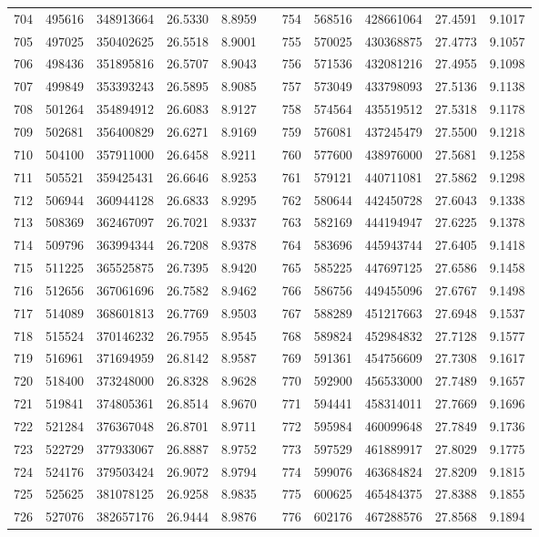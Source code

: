 \begin{longtable}{rrrrrrrrrrr}
704&495616&348913664&26.5330&8.8959&&754&568516&428661064&27.4591&9.1017\\
705&497025&350402625&26.5518&8.9001&&755&570025&430368875&27.4773&9.1057\\
706&498436&351895816&26.5707&8.9043&&756&571536&432081216&27.4955&9.1098\\
707&499849&353393243&26.5895&8.9085&&757&573049&433798093&27.5136&9.1138\\
708&501264&354894912&26.6083&8.9127&&758&574564&435519512&27.5318&9.1178\\
709&502681&356400829&26.6271&8.9169&&759&576081&437245479&27.5500&9.1218\\
710&504100&357911000&26.6458&8.9211&&760&577600&438976000&27.5681&9.1258\\
711&505521&359425431&26.6646&8.9253&&761&579121&440711081&27.5862&9.1298\\
712&506944&360944128&26.6833&8.9295&&762&580644&442450728&27.6043&9.1338\\
713&508369&362467097&26.7021&8.9337&&763&582169&444194947&27.6225&9.1378\\
714&509796&363994344&26.7208&8.9378&&764&583696&445943744&27.6405&9.1418\\
715&511225&365525875&26.7395&8.9420&&765&585225&447697125&27.6586&9.1458\\
716&512656&367061696&26.7582&8.9462&&766&586756&449455096&27.6767&9.1498\\
717&514089&368601813&26.7769&8.9503&&767&588289&451217663&27.6948&9.1537\\
718&515524&370146232&26.7955&8.9545&&768&589824&452984832&27.7128&9.1577\\
719&516961&371694959&26.8142&8.9587&&769&591361&454756609&27.7308&9.1617\\
720&518400&373248000&26.8328&8.9628&&770&592900&456533000&27.7489&9.1657\\
721&519841&374805361&26.8514&8.9670&&771&594441&458314011&27.7669&9.1696\\
722&521284&376367048&26.8701&8.9711&&772&595984&460099648&27.7849&9.1736\\
723&522729&377933067&26.8887&8.9752&&773&597529&461889917&27.8029&9.1775\\
724&524176&379503424&26.9072&8.9794&&774&599076&463684824&27.8209&9.1815\\
725&525625&381078125&26.9258&8.9835&&775&600625&465484375&27.8388&9.1855\\
726&527076&382657176&26.9444&8.9876&&776&602176&467288576&27.8568&9.1894\\

\end{longtable}

